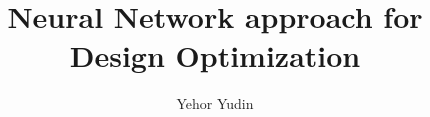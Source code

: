 \documentclass[]{article}
\title{Neural Network approach for Design Optimization}
\author{Yehor Yudin}
\begin{document}
\maketitle

\begin{abstract}

\end{abstract}

\section{}
\end{document}
